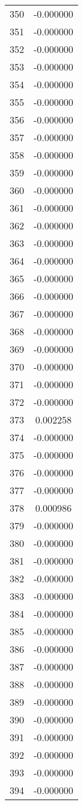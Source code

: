 \documentclass[12pt]{article}
\begin{document}
\begin{longtable}{@{}cc@{}}
350 & -0.000000 \\
351 & -0.000000 \\
352 & -0.000000 \\
353 & -0.000000 \\
354 & -0.000000 \\
355 & -0.000000 \\
356 & -0.000000 \\
357 & -0.000000 \\
358 & -0.000000 \\
359 & -0.000000 \\
360 & -0.000000 \\
361 & -0.000000 \\
362 & -0.000000 \\
363 & -0.000000 \\
364 & -0.000000 \\
365 & -0.000000 \\
366 & -0.000000 \\
367 & -0.000000 \\
368 & -0.000000 \\
369 & -0.000000 \\
370 & -0.000000 \\
371 & -0.000000 \\
372 & -0.000000 \\
373 & 0.002258 \\
374 & -0.000000 \\
375 & -0.000000 \\
376 & -0.000000 \\
377 & -0.000000 \\
378 & 0.000986 \\
379 & -0.000000 \\
380 & -0.000000 \\
381 & -0.000000 \\
382 & -0.000000 \\
383 & -0.000000 \\
384 & -0.000000 \\
385 & -0.000000 \\
386 & -0.000000 \\
387 & -0.000000 \\
388 & -0.000000 \\
389 & -0.000000 \\
390 & -0.000000 \\
391 & -0.000000 \\
392 & -0.000000 \\
393 & -0.000000 \\
394 & -0.000000 \\

\end{longtable}
\end{document}
